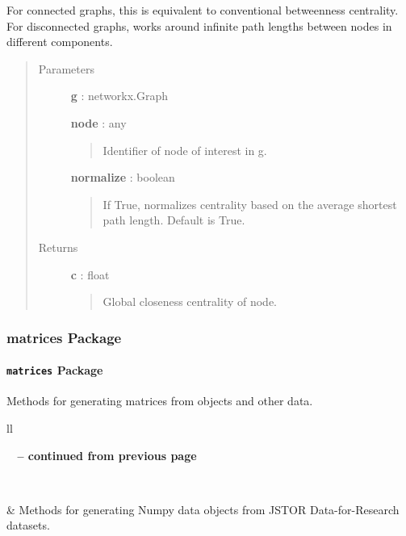 \documentclass[letterpaper,10pt,english]{sphinxmanual}
\begin{document}
\begin{fulllineitems}
For connected graphs, this is equivalent to conventional betweenness
centrality. For disconnected graphs, works around infinite path lengths
between nodes in different components.
\begin{quote}\begin{description}
\item[{Parameters }] \leavevmode
\textbf{g} : networkx.Graph

\textbf{node} : any
\begin{quote}

Identifier of node of interest in g.
\end{quote}

\textbf{normalize} : boolean
\begin{quote}

If True, normalizes centrality based on the average shortest path
length. Default is True.
\end{quote}

\item[{Returns }] \leavevmode
\textbf{c} : float
\begin{quote}

Global closeness centrality of node.
\end{quote}

\end{description}\end{quote}

\end{fulllineitems}



\subsubsection{matrices Package}
\label{tethne.matrices:matrices-package}\label{tethne.matrices::doc}

\paragraph{\texttt{matrices} Package}
\label{tethne.matrices:id1}\label{tethne.matrices:module-tethne.matrices}
Methods for generating matrices from {\hyperref[tethne:tethne.data.Paper]{}} objects and other data.

\begin{longtable}{ll}
\hline
\endfirsthead

%
{{\bfseries \tablename\ \thetable{} -- continued from previous page}} \\
\hline
\endhead

\hline {} \\ \hline
\endfoot

\hline
\endlastfoot


{\hyperref[tethne.matrices:module-tethne.matrices.dfr]{}}
 & 
Methods for generating Numpy data objects from JSTOR Data-for-Research datasets.
\\\hline
\end{longtable}
\end{document}
